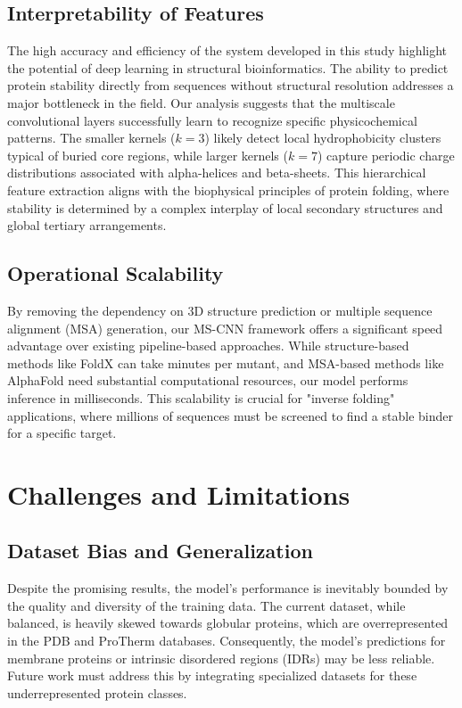 \documentclass[conference]{IEEEtran}
\begin{document}
\subsection{Interpretability of Features}
The high accuracy and efficiency of the system developed in this study highlight the potential of deep learning in structural bioinformatics. The ability to predict protein stability directly from sequences without structural resolution addresses a major bottleneck in the field. Our analysis suggests that the multiscale convolutional layers successfully learn to recognize specific physicochemical patterns. The smaller kernels ($k=3$) likely detect local hydrophobicity clusters typical of buried core regions, while larger kernels ($k=7$) capture periodic charge distributions associated with alpha-helices and beta-sheets. This hierarchical feature extraction aligns with the biophysical principles of protein folding, where stability is determined by a complex interplay of local secondary structures and global tertiary arrangements.

\subsection{Operational Scalability}
By removing the dependency on 3D structure prediction or multiple sequence alignment (MSA) generation, our MS-CNN framework offers a significant speed advantage over existing pipeline-based approaches. While structure-based methods like FoldX can take minutes per mutant, and MSA-based methods like AlphaFold need substantial computational resources, our model performs inference in milliseconds. This scalability is crucial for "inverse folding" applications, where millions of sequences must be screened to find a stable binder for a specific target.

\section{Challenges and Limitations}
\subsection{Dataset Bias and Generalization}
Despite the promising results, the model's performance is inevitably bounded by the quality and diversity of the training data. The current dataset, while balanced, is heavily skewed towards globular proteins, which are overrepresented in the PDB and ProTherm databases. Consequently, the model's predictions for membrane proteins or intrinsic disordered regions (IDRs) may be less reliable. Future work must address this by integrating specialized datasets for these underrepresented protein classes.
\end{document}

